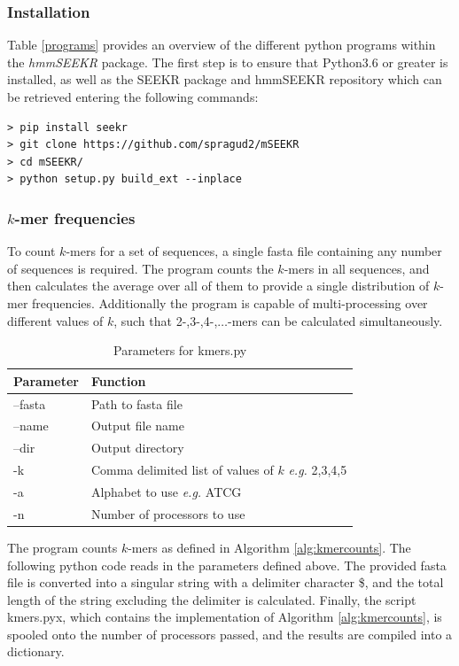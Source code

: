 \subsubsection{Installation}
Table \ref{programs} provides an overview of the different python programs within the \emph{hmmSEEKR} package. The first step is to ensure that Python3.6 or greater is installed, as well as the SEEKR package and hmmSEEKR repository which can be retrieved entering the following commands:

\begin{verbatim}
> pip install seekr
> git clone https://github.com/spragud2/mSEEKR
> cd mSEEKR/
> python setup.py build_ext --inplace
\end{verbatim}

\subsubsection{$k$-mer frequencies}
To count $k$-mers for a set of sequences, a single fasta file containing any number of sequences is required. The program counts the $k$-mers in all sequences, and then calculates the average over all of them to provide a single distribution of $k$-mer frequencies. Additionally the program is capable of multi-processing over different values of $k$, such that 2-,3-,4-,$\dots$-mers can be calculated simultaneously. 
\begin{table}[h]
\centering
 \begin{tabular}{|l l|}
 \hline
 Parameter & Function\\
 \hline
 --fasta & Path to fasta file \\
 --name & Output file name \\
 --dir & Output directory \\
 -k & Comma delimited list of values of $k$ \emph{e.g.} 2,3,4,5\\
 -a & Alphabet to use \emph{e.g.} ATCG\\
 -n & Number of processors to use\\
 \hline
 
\end{tabular}
\caption{Parameters for kmers.py}
\label{tab:kmerparams}
\end{table}

The program counts $k$-mers as defined in Algorithm \ref{alg:kmercounts}. The following python code reads in the parameters defined above. The provided fasta file is converted into a singular string with a delimiter character \$, and the total length of the string excluding the delimiter is calculated. Finally, the script kmers.pyx, which contains the implementation of Algorithm \ref{alg:kmercounts}, is spooled onto the number of processors passed, and the results are compiled into a dictionary. 

